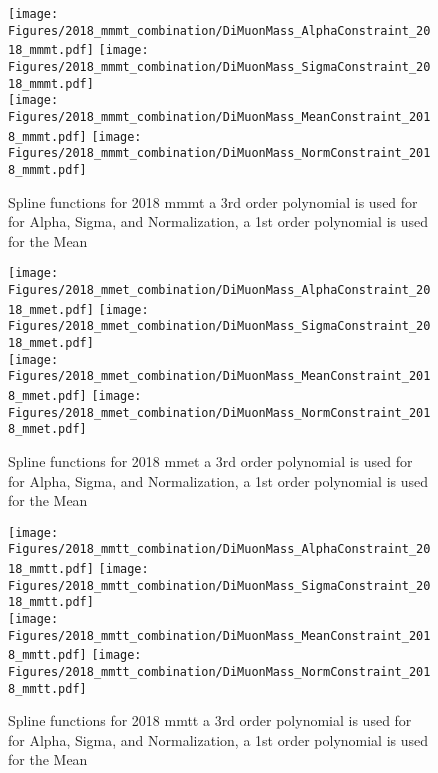 \begin{figure}[ht!b]
    \centering 
    \texttt{[image: Figures/2018\_mmmt\_combination/DiMuonMass\_AlphaConstraint\_2018\_mmmt.pdf]}
    \texttt{[image: Figures/2018\_mmmt\_combination/DiMuonMass\_SigmaConstraint\_2018\_mmmt.pdf]}\\
    \texttt{[image: Figures/2018\_mmmt\_combination/DiMuonMass\_MeanConstraint\_2018\_mmmt.pdf]}
    \texttt{[image: Figures/2018\_mmmt\_combination/DiMuonMass\_NormConstraint\_2018\_mmmt.pdf]}\\
    \caption{\label{fig:spline_2018_mmmt} Spline functions for 2018 mmmt a 3rd order polynomial is used for  for Alpha, Sigma, and Normalization, a 1st order polynomial is used for the Mean}
\end{figure}
\begin{figure}[ht!b]
    \centering 
    \texttt{[image: Figures/2018\_mmet\_combination/DiMuonMass\_AlphaConstraint\_2018\_mmet.pdf]}
    \texttt{[image: Figures/2018\_mmet\_combination/DiMuonMass\_SigmaConstraint\_2018\_mmet.pdf]}\\
    \texttt{[image: Figures/2018\_mmet\_combination/DiMuonMass\_MeanConstraint\_2018\_mmet.pdf]}
    \texttt{[image: Figures/2018\_mmet\_combination/DiMuonMass\_NormConstraint\_2018\_mmet.pdf]}\\
    \caption{\label{fig:spline_2018_mmet} Spline functions for 2018 mmet a 3rd order polynomial is used for  for Alpha, Sigma, and Normalization, a 1st order polynomial is used for the Mean}
\end{figure}
\begin{figure}[ht!b]
    \centering 
    \texttt{[image: Figures/2018\_mmtt\_combination/DiMuonMass\_AlphaConstraint\_2018\_mmtt.pdf]}
    \texttt{[image: Figures/2018\_mmtt\_combination/DiMuonMass\_SigmaConstraint\_2018\_mmtt.pdf]}\\
    \texttt{[image: Figures/2018\_mmtt\_combination/DiMuonMass\_MeanConstraint\_2018\_mmtt.pdf]}
    \texttt{[image: Figures/2018\_mmtt\_combination/DiMuonMass\_NormConstraint\_2018\_mmtt.pdf]}\\
    \caption{\label{fig:spline_2018_mmtt} Spline functions for 2018 mmtt a 3rd order polynomial is used for  for Alpha, Sigma, and Normalization, a 1st order polynomial is used for the Mean}
\end{figure}
